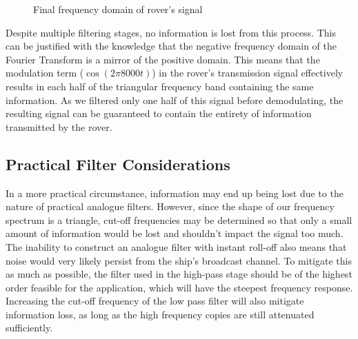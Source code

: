 \documentclass[12pt]{article}
\numberwithin{equation}{section}
\numberwithin{figure}{section}
\numberwithin{table}{section}
\begin{document}
\begin{figure}[ht]
    \centering
    \caption{Final frequency domain of rover's signal\label{fig:p1-filter-demod}}
\end{figure}

Despite multiple filtering stages, no information is lost from this process.
This can be justified with the knowledge that the negative frequency domain of
the Fourier Transform is a mirror of the positive domain. This means that the
modulation term ($\cos(2\pi 8000t)$) in the rover's transmission signal
effectively results in each half of the triangular frequency band containing
the same information. As we filtered only one half of this signal before
demodulating, the resulting signal can be guaranteed to contain the entirety of
information transmitted by the rover.

\subsection{Practical Filter Considerations}
In a more practical circumstance, information may end up being lost due to the
nature of practical analogue filters. However, since the shape of our frequency
spectrum is a triangle, cut-off frequencies may be determined so that only a
small amount of information would be lost and shouldn't impact the signal too
much. The inability to construct an analogue filter with instant roll-off also
means that noise would very likely persist from the ship's broadcast channel.
To mitigate this as much as possible, the filter used in the high-pass stage
should be of the highest order feasible for the application, which will have
the steepest frequency response. Increasing the cut-off frequency of the low
pass filter will also mitigate information loss, as long as the high frequency
copies are still attenuated sufficiently. \pagebreak
\end{document}
